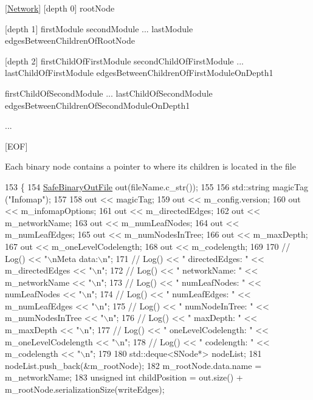 \mbox{[}\mbox{\hyperlink{classNetwork}{Network}}\mbox{]} \mbox{[}depth 0\mbox{]} root\+Node

\mbox{[}depth 1\mbox{]} first\+Module second\+Module ... last\+Module edges\+Between\+Children\+Of\+Root\+Node

\mbox{[}depth 2\mbox{]} first\+Child\+Of\+First\+Module second\+Child\+Of\+First\+Module ... last\+Child\+Of\+First\+Module edges\+Between\+Children\+Of\+First\+Module\+On\+Depth1

first\+Child\+Of\+Second\+Module ... last\+Child\+Of\+Second\+Module edges\+Between\+Children\+Of\+Second\+Module\+On\+Depth1

...

\mbox{[}E\+OF\mbox{]}

Each binary node contains a pointer to where its children is located in the file 
\begin{DoxyCode}
153 \{
154     \mbox{\hyperlink{classSafeBinaryOutFile}{SafeBinaryOutFile}} out(fileName.c\_str());
155 
156     std::string magicTag (\textcolor{stringliteral}{"Infomap"});
157 
158     out << magicTag;
159     out << m\_config.version;
160     out << m\_infomapOptions;
161     out << m\_directedEdges;
162     out << m\_networkName;
163     out << m\_numLeafNodes;
164     out << m\_numLeafEdges;
165     out << m\_numNodesInTree;
166     out << m\_maxDepth;
167     out << m\_oneLevelCodelength;
168     out << m\_codelength;
169 
170 \textcolor{comment}{//      Log() << "\(\backslash\)nMeta data:\(\backslash\)n";}
171 \textcolor{comment}{//      Log() << "  directedEdges: " << m\_directedEdges << "\(\backslash\)n";}
172 \textcolor{comment}{//      Log() << "  networkName: " << m\_networkName << "\(\backslash\)n";}
173 \textcolor{comment}{//      Log() << "  numLeafNodes: " << numLeafNodes << "\(\backslash\)n";}
174 \textcolor{comment}{//      Log() << "  numLeafEdges: " << m\_numLeafEdges << "\(\backslash\)n";}
175 \textcolor{comment}{//      Log() << "  numNodeInTree: " << m\_numNodesInTree << "\(\backslash\)n";}
176 \textcolor{comment}{//      Log() << "  maxDepth: " << m\_maxDepth << "\(\backslash\)n";}
177 \textcolor{comment}{//      Log() << "  oneLevelCodelength: " << m\_oneLevelCodelength << "\(\backslash\)n";}
178 \textcolor{comment}{//      Log() << "  codelength: " << m\_codelength << "\(\backslash\)n";}
179 
180     std::deque<SNode*> nodeList;
181     nodeList.push\_back(&m\_rootNode);
182     m\_rootNode.data.name = m\_networkName;
183     \textcolor{keywordtype}{unsigned} \textcolor{keywordtype}{int} childPosition = out.size() + m\_rootNode.serializationSize(writeEdges);

\end{DoxyCode}
